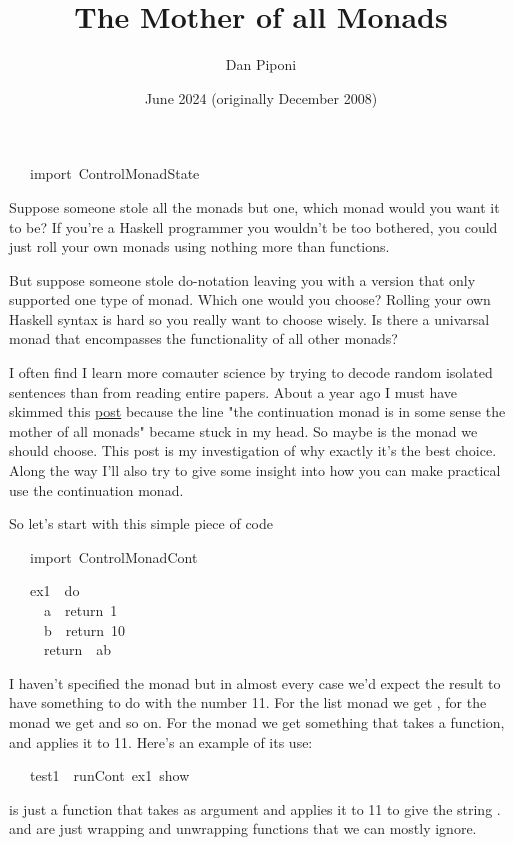 \documentclass[12pt]{article}
\title{The Mother of all Monads}
\author{Dan Piponi}
\date{June 2024 (originally December 2008)}
\begin{document}
\maketitle
\begin{tabbing}\ttfamily
~~~import~ControlMonadState
\end{tabbing}
Suppose someone stole all the monads but one, which monad would you want it to be? If you're a Haskell programmer you wouldn't be too bothered, you could just roll your own monads using nothing more than functions.

But suppose someone stole do-notation leaving you with a version that only supported one type of monad. Which one would you choose? Rolling your own Haskell syntax is hard so you really want to choose wisely. Is there a univarsal monad that encompasses the functionality of all other monads?

I often find I learn more comauter science by trying to decode random isolated sentences than from reading entire papers. About a year ago I must have skimmed this \href{http://sneezy.cs.nott.ac.uk/fplunch/weblog/?m=200712}{post} because the line "the continuation monad is in some sense the mother of all monads" became stuck in my head. So maybe  is the monad we should choose. This post is my investigation of why exactly it's the best choice. Along the way I'll also try to give some insight into how you can make practical use the continuation monad.

So let's start with this simple piece of code
\begin{tabbing}\ttfamily
~~~import~ControlMonadCont
\end{tabbing}
\begin{tabbing}\ttfamily
~~~ex1~~do\\
\ttfamily ~~~~~a~~return~1\\
\ttfamily ~~~~~b~~return~10\\
\ttfamily ~~~~~return~~ab
\end{tabbing}
I haven't specified the monad but in almost every case we'd expect the result to have something to do with the number 11. For the list monad we get , for the  monad we get  and so on. For the  monad we get something that takes a function, and applies it to 11. Here's an example of its use:
\begin{tabbing}\ttfamily
~~~test1~~runCont~ex1~show
\end{tabbing}
 is just a function that takes as argument  and applies it to 11 to give the string .  and  are just wrapping and unwrapping functions that we can mostly ignore.
\end{document}

